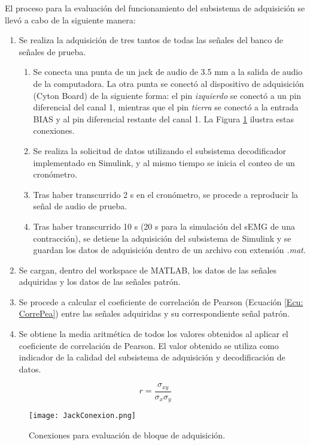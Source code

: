 \newpage
El proceso para la evaluación del funcionamiento del subsistema de adquisición se llevó a cabo de la siguiente manera:
\begin{enumerate}
	\item Se realiza la adquisición de tres tantos de todas las señales del banco de señales de prueba.
	\begin{enumerate}
		\item Se conecta una punta de un jack de audio de 3.5 mm a la salida de audio de la computadora. La otra punta se conectó al dispositivo de adquisición (Cyton Board) de la siguiente forma: el pin \emph{izquierdo} se conectó a un pin diferencial del canal 1, mientras que el pin \emph{tierra} se conectó a la entrada BIAS y al pin diferencial restante del canal 1. La Figura \ref{Figura: JackConexion} ilustra estas conexiones.
		\item Se realiza la solicitud de datos utilizando el subsistema decodificador implementado en Simulink, y al mismo tiempo se inicia el conteo de un cronómetro.
		\item Tras haber transcurrido 2 s en el cronómetro, se procede a reproducir la señal de audio de prueba.
		\item Tras haber transcurrido 10 s (20 s para la simulación del sEMG de una contracción), se detiene la adquisición del subsistema de Simulink y se guardan los datos de adquisición dentro de un archivo con extensión \emph{.mat}.
	\end{enumerate}
	\item Se cargan, dentro del workspace de MATLAB, los datos de las señales adquiridas y los datos de las señales patrón.
	\item Se procede a calcular el coeficiente de correlación de Pearson (Ecuación \ref{Ecu: CorrePea}) entre las señales adquiridas y su correspondiente señal patrón.
	\item Se obtiene la media aritmética de todos los valores obtenidos al aplicar el coeficiente de correlación de Pearson. El valor obtenido se utiliza como indicador de la calidad del subsistema de adquisición y decodificación de datos.
\end{enumerate}

\begin{equation}
	r = \frac{\sigma_{xy}}{\sigma_{x}\sigma_{y}}
	\label{Ecu: CorrePea}
\end{equation}

\begin{figure}
	\centering
	\texttt{[image: JackConexion.png]}
	\caption{Conexiones para evaluación de bloque de adquisición.}
	\label{Figura: JackConexion}
\end{figure}

